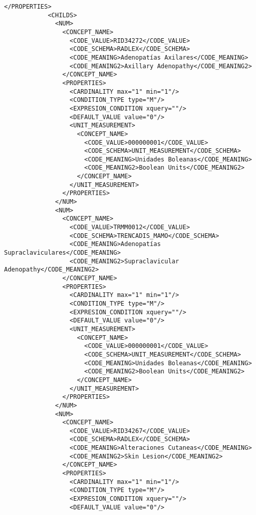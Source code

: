 \begin{lstlisting}[label=some-code,caption=Some Code]
            </PROPERTIES>
            <CHILDS>
              <NUM>
                <CONCEPT_NAME>
                  <CODE_VALUE>RID34272</CODE_VALUE>
                  <CODE_SCHEMA>RADLEX</CODE_SCHEMA>
                  <CODE_MEANING>Adenopatías Axilares</CODE_MEANING>
                  <CODE_MEANING2>Axillary Adenopathy</CODE_MEANING2>
                </CONCEPT_NAME>
                <PROPERTIES>
                  <CARDINALITY max="1" min="1"/>
                  <CONDITION_TYPE type="M"/>
                  <EXPRESION_CONDITION xquery=""/>
                  <DEFAULT_VALUE value="0"/>
                  <UNIT_MEASUREMENT>
                    <CONCEPT_NAME>
                      <CODE_VALUE>000000001</CODE_VALUE>
                      <CODE_SCHEMA>UNIT_MEASUREMENT</CODE_SCHEMA>
                      <CODE_MEANING>Unidades Boleanas</CODE_MEANING>
                      <CODE_MEANING2>Boolean Units</CODE_MEANING2>
                    </CONCEPT_NAME>
                  </UNIT_MEASUREMENT>
                </PROPERTIES>
              </NUM>
              <NUM>
                <CONCEPT_NAME>
                  <CODE_VALUE>TRMM0012</CODE_VALUE>
                  <CODE_SCHEMA>TRENCADIS_MAMO</CODE_SCHEMA>
                  <CODE_MEANING>Adenopatías Supraclaviculares</CODE_MEANING>
                  <CODE_MEANING2>Supraclavicular Adenopathy</CODE_MEANING2>
                </CONCEPT_NAME>
                <PROPERTIES>
                  <CARDINALITY max="1" min="1"/>
                  <CONDITION_TYPE type="M"/>
                  <EXPRESION_CONDITION xquery=""/>
                  <DEFAULT_VALUE value="0"/>
                  <UNIT_MEASUREMENT>
                    <CONCEPT_NAME>
                      <CODE_VALUE>000000001</CODE_VALUE>
                      <CODE_SCHEMA>UNIT_MEASUREMENT</CODE_SCHEMA>
                      <CODE_MEANING>Unidades Boleanas</CODE_MEANING>
                      <CODE_MEANING2>Boolean Units</CODE_MEANING2>
                    </CONCEPT_NAME>
                  </UNIT_MEASUREMENT>
                </PROPERTIES>
              </NUM>
              <NUM>
                <CONCEPT_NAME>
                  <CODE_VALUE>RID34267</CODE_VALUE>
                  <CODE_SCHEMA>RADLEX</CODE_SCHEMA>
                  <CODE_MEANING>Alteraciones Cutaneas</CODE_MEANING>
                  <CODE_MEANING2>Skin Lesion</CODE_MEANING2>
                </CONCEPT_NAME>
                <PROPERTIES>
                  <CARDINALITY max="1" min="1"/>
                  <CONDITION_TYPE type="M"/>
                  <EXPRESION_CONDITION xquery=""/>
                  <DEFAULT_VALUE value="0"/>

\end{lstlisting}
